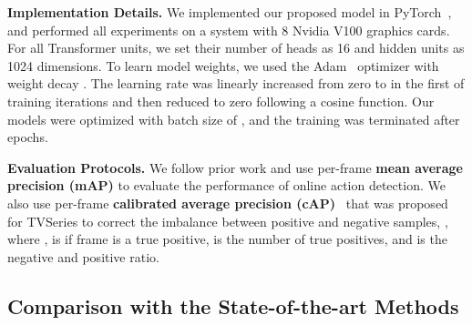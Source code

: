 \textbf{Implementation Details.}
We implemented our proposed model in PyTorch~\cite{pytorch},
and performed all experiments on a system with 8 Nvidia V100 graphics cards.
For all Transformer units, we set their number of heads as 16 and hidden units as 1024 dimensions.
To learn model weights, we used the Adam~\cite{kingma2014adam} optimizer with weight decay .
The learning rate was linearly increased from zero to  in the first  of training iterations and then reduced to zero following a cosine function.
Our models were optimized with batch size of , and the training was terminated after  epochs.

\textbf{Evaluation Protocols.}
We follow prior work and use per-frame \textbf{mean average precision (mAP)} to evaluate the performance of online action detection.
We also use per-frame \textbf{calibrated average precision (cAP)}~\cite{de2016online} that was proposed for TVSeries to correct the imbalance between positive and negative samples,
,
where ,  is  if frame  is a true positive,  is the number of true positives, and  is the negative and positive ratio.

\vspace{-1.5mm}
\subsection{Comparison with the State-of-the-art Methods}
\label{exp:sota}
\vspace{-2mm}

